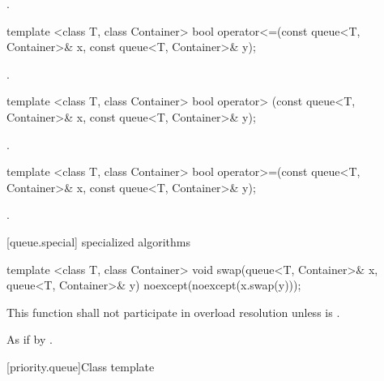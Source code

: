 \begin{itemdescr}
\pnum
\returns
{}.
\end{itemdescr}

%
\begin{itemdecl}
template <class T, class Container>
  bool operator<=(const queue<T, Container>& x, const queue<T, Container>& y);
\end{itemdecl}

\begin{itemdescr}
\pnum
\returns
{}.
\end{itemdescr}

%
\begin{itemdecl}
template <class T, class Container>
  bool operator> (const queue<T, Container>& x, const queue<T, Container>& y);
\end{itemdecl}

\begin{itemdescr}
\pnum
\returns
{}.
\end{itemdescr}

%
\begin{itemdecl}
template <class T, class Container>
    bool operator>=(const queue<T, Container>& x,
                    const queue<T, Container>& y);
\end{itemdecl}

\begin{itemdescr}
\pnum
\returns
{}.
\end{itemdescr}

[queue.special]{ specialized algorithms}

%
%
\begin{itemdecl}
template <class T, class Container>
  void swap(queue<T, Container>& x, queue<T, Container>& y) noexcept(noexcept(x.swap(y)));
\end{itemdecl}

\begin{itemdescr}
\pnum
\remarks
This function shall not participate in overload resolution
unless  is .

\pnum
\effects As if by .
\end{itemdescr}

[priority.queue]{Class template }

